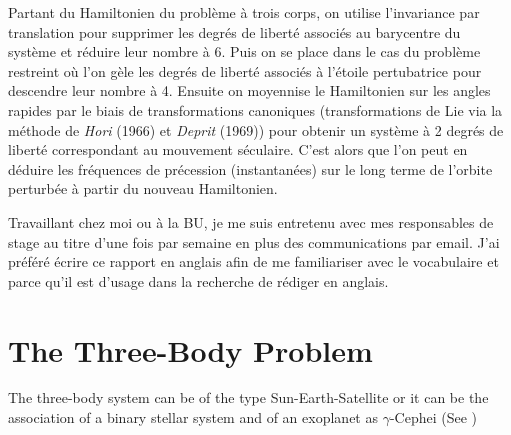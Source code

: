 \documentclass[a4paper]{article}
\begin{document}
{Partant du Hamiltonien du probl\`eme \`a trois corps, on utilise l'invariance par translation pour supprimer les degr\'es de libert\'e associ\'es au barycentre du syst\`eme et r\'eduire leur nombre \`a 6.
Puis on se place dans le cas du probl\`eme restreint o\`u l'on g\`ele les degr\'es de libert\'e associ\'es \`a l'\'etoile pertubatrice pour descendre leur nombre \`a 4.
Ensuite on moyennise le Hamiltonien sur les angles rapides par le biais de transformations canoniques (transformations de Lie via la m\'ethode de \textit{Hori} (1966) et \textit{Deprit} (1969)) pour obtenir un syst\`eme \`a 2 degr\'es de libert\'e correspondant au mouvement s\'eculaire.
C'est alors que l'on peut en d\'eduire les fr\'equences de pr\'ecession (instantan\'ees) sur le long terme de l'orbite perturb\'ee \`a partir du nouveau Hamiltonien.

Travaillant chez moi ou \`a la BU, je me suis entretenu avec mes responsables de stage au titre d'une fois par semaine en plus des communications par email.
J'ai pr\'ef\'er\'e \'ecrire ce rapport en anglais afin de me familiariser avec le vocabulaire et parce qu'il est d'usage dans la recherche de r\'ediger en anglais.
}


\section{The Three-Body Problem}
The three-body system can be of the type Sun-Earth-Satellite or it can be the association of a binary stellar system and of an exoplanet as $\gamma$-Cephei (See \cite{giuppone})
\end{document}
